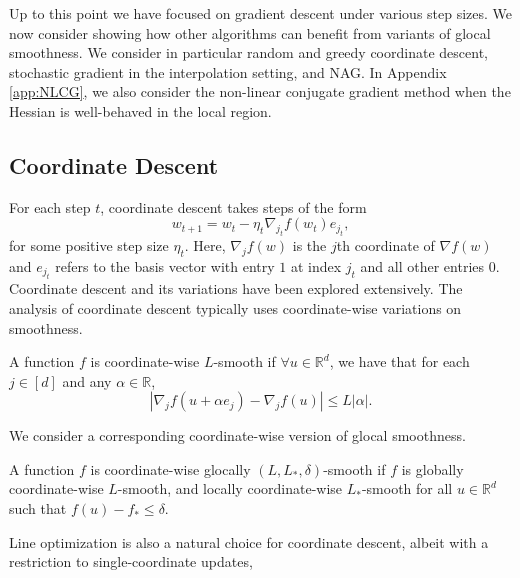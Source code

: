 \documentclass[10pt]{article} %
\begin{document}
Up to this point we have focused on gradient descent under various step sizes. We now consider showing how other algorithms can benefit from variants of glocal smoothness. 
We consider in particular random and greedy coordinate descent, stochastic gradient in the interpolation setting, and
NAG. In Appendix \ref{app:NLCG}, we also consider the non-linear conjugate gradient method when the Hessian is well-behaved in the local region.

\subsection{Coordinate Descent}
\label{coordinate-descent-section}

For each step $t$, coordinate descent takes steps of the form
\begin{equation}
    \label{coordinate-descent}
    w_{t+1} = w_{t} - \eta_{t} \nabla_{j_{t}} f(w_{t})e_{j_{t}},
\end{equation}
for some positive step size $\eta_t$. Here, $\nabla_{j} f(w)$ is the $j$th coordinate of $\nabla f(w)$ and $e_{j_{t}}$ refers to the  basis vector with entry $1$ at index $j_{t}$ and all other entries $0$. Coordinate descent and its variations \cite{nesterov2012cd, nutini2015coordinate, wright2015coordinate,locatello2018matching} have been explored extensively. The analysis of coordinate descent typically uses coordinate-wise variations on smoothness.
\begin{definition}
    \label{coordinate-smoothness}
    A function $f$ is coordinate-wise $L$-smooth if $\forall u  \in \mathbb{R}^d$, we have that for each $j \in [d]$ and any $\alpha \in \mathbb{R}$,
    \[
        |\nabla_j f(u + \alpha e_j) - \nabla_j f(u)| \leq L|\alpha|.
    \]
\end{definition}
We consider a corresponding coordinate-wise version of glocal smoothness.
\begin{definition}
    \label{glocal-smoothness-coordinate}
    A function $f$ is coordinate-wise glocally $(L,L_*, \delta)$-smooth if $f$ is globally coordinate-wise $L$-smooth, and locally coordinate-wise $L_*$-smooth for all $u \in \mathbb{R}^d$ such that $f(u) - f_* \leq \delta$.
\end{definition}
Line optimization is also a natural choice for coordinate descent, albeit with a restriction to single-coordinate updates,
\end{document}
